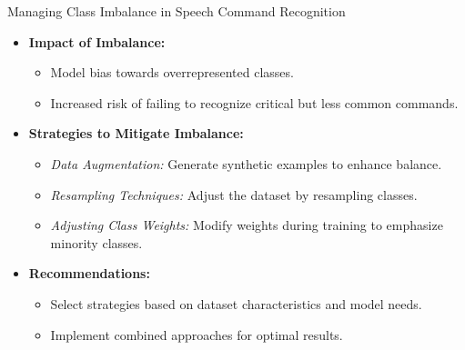 \documentclass{beamer}
\begin{document}
\begin{frame}{Managing Class Imbalance in Speech Command Recognition}
  \begin{itemize}
    \item \textbf{Impact of Imbalance:}
      \begin{itemize}
        \item Model bias towards overrepresented classes.
        \item Increased risk of failing to recognize critical but less common commands.
      \end{itemize}
    \item \textbf{Strategies to Mitigate Imbalance:}
      \begin{itemize}
        \item \textit{Data Augmentation:} Generate synthetic examples to enhance balance.
        \item \textit{Resampling Techniques:} Adjust the dataset by resampling classes.
        \item \textit{Adjusting Class Weights:} Modify weights during training to emphasize minority classes.
      \end{itemize}
    \item \textbf{Recommendations:}
      \begin{itemize}
        \item Select strategies based on dataset characteristics and model needs.
        \item Implement combined approaches for optimal results.
      \end{itemize}
  \end{itemize}
\end{frame}
\end{document}

